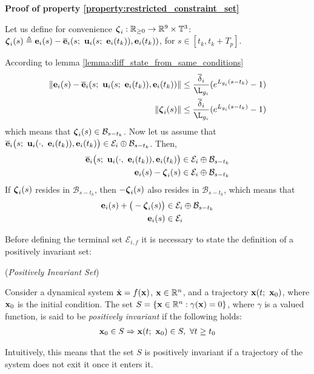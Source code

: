 \begin{gg_box}
\textbf{Proof of property \eqref{property:restricted_constraint_set}}

Let us define for convenience $\bm{\mathbf{\zeta}}_i : \mathbb{R}_{\geq 0} \to \mathbb{R}^9 \times \mathbb{T}^3$:
$\bm{\mathbf{\zeta}}_i(s) \triangleq \bm{\mathbf{e}}_i(s) - \overline{\bm{\mathbf{e}}}_i(s;\ \bm{\mathbf{u}}_i(s;\ \bm{\mathbf{e}}_i(t_k)), \bm{\mathbf{e}}_i(t_k))$,
for $s \in [t_k, t_k + T_p]$.

According to lemma
\eqref{lemma:diff_state_from_same_conditions}
\begin{align}
 \|\vect{e}_i(s) - \overline{\vect{e}}_i(s;\ \vect{u}_i(s;\ \vect{e}_i(t_k)), \vect{e}_i(t_k))\|
   &\leq \dfrac{\overline{\delta}_i}{\L_{g_i}} (e^{L_{g_i} (s-t_k)} - 1) \\
 \|\vect{\zeta}_i(s)\| &\leq \dfrac{\overline{\delta}_i}{\L_{g_i}} (e^{L_{g_i} (s-t_k)} - 1)
\end{align}
which means that $\bm{\mathbf{\zeta}}_i(s) \in \mathcal{B}_{s-t_k}$.
Now let us assume that
$\overline{\vect{e}}_i\big( s;\ \vect{u}_i(\cdot,\ \vect{e}_i(t_k)), \vect{e}_i(t_k) \big) \in \mathcal{E}_i \oplus \mathcal{B}_{s-t_k}$.
Then,
\begin{align}
  \overline{\bm{\mathbf{e}}}_i\big( s;\ \bm{\mathbf{u}}_i(\cdot,\ \bm{\mathbf{e}}_i(t_k)), \bm{\mathbf{e}}_i(t_k) \big) &\in \mathcal{E}_i \oplus \mathcal{B}_{s-t_k} \\
  \bm{\mathbf{e}}_i(s) - \bm{\mathbf{\zeta}}_i(s) &\in \mathcal{E}_i \oplus \mathcal{B}_{s-t_k}
\end{align}
If $\bm{\mathbf{\zeta}}_i(s)$ resides in $\mathcal{B}_{s-t_k}$, then
$-\bm{\mathbf{\zeta}}_i(s)$ also resides in $\mathcal{B}_{s-t_k}$, which means that
\begin{align}
  \bm{\mathbf{e}}_i(s) + \big(-\bm{\mathbf{\zeta}}_i(s)\big) &\in \mathcal{E}_i \oplus \mathcal{B}_{s-t_k} \\
  \bm{\mathbf{e}}_i(s) &\in \mathcal{E}_i
\end{align}
\qedsymbol
\end{gg_box}




Before defining the terminal set
$\mathcal{E}_{i,f}$ it is necessary to state the definition of a positively
invariant set:
\begin{bw_box}
  \begin{definition} (\textit{Positively Invariant Set})

    Consider a dynamical system $\dot{\bm{\mathbf{x}}} = f(\bm{\mathbf{x}})$,
    $\bm{\mathbf{x}} \in \mathbb{R}^n$, and a trajectory $\bm{\mathbf{x}}(t;\ \bm{\mathbf{x}}_0)$,
    where $\bm{\mathbf{x}}_0$ is the initial condition. The set
    $S = \{\bm{\mathbf{x}} \in \mathbb{R}^n : \gamma(\bm{\mathbf{x}}) = 0\}$, where
    $\gamma$ is a valued function, is said to be \textit{positively invariant}
    if the following holds:
    \begin{align}
      \vect{x}_0 \in S \Rightarrow \vect{x}(t;\ \vect{x}_0) \in S,\ \forall t \geq t_0
    \end{align}

    Intuitively, this means that the set $S$ is positively invariant if a
    trajectory of the system does not exit it once it enters it.
    \label{def:positively_invariant_2}
  \end{definition}
\end{bw_box}

